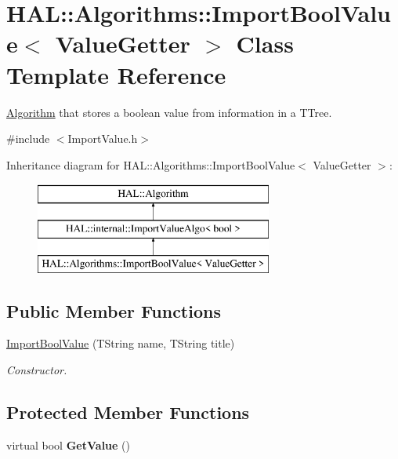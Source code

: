\hypertarget{class_h_a_l_1_1_algorithms_1_1_import_bool_value}{\section{H\+A\+L\+:\+:Algorithms\+:\+:Import\+Bool\+Value$<$ Value\+Getter $>$ Class Template Reference}
\label{class_h_a_l_1_1_algorithms_1_1_import_bool_value}
}


\hyperlink{class_h_a_l_1_1_algorithm}{Algorithm} that stores a boolean value from information in a T\+Tree.  




{\ttfamily \#include $<$Import\+Value.\+h$>$}

Inheritance diagram for H\+A\+L\+:\+:Algorithms\+:\+:Import\+Bool\+Value$<$ Value\+Getter $>$\+:\begin{figure}[H]
\begin{center}
\leavevmode
\includegraphics[height=3.000000cm]{class_h_a_l_1_1_algorithms_1_1_import_bool_value}
\end{center}
\end{figure}
\subsection*{Public Member Functions}
\begin{DoxyCompactItemize}
\item 
\hyperlink{class_h_a_l_1_1_algorithms_1_1_import_bool_value_a06b77726d1cfcd155fb7e28ee304a917}{Import\+Bool\+Value} (T\+String name, T\+String title)
\begin{DoxyCompactList}\small\item\em Constructor. \end{DoxyCompactList}\end{DoxyCompactItemize}
\subsection*{Protected Member Functions}
\begin{DoxyCompactItemize}
\item 
\hypertarget{class_h_a_l_1_1_algorithms_1_1_import_bool_value_a71a3ae1f800a947904fdf0d1c7af4c17}{virtual bool {\bfseries Get\+Value} ()}\label{class_h_a_l_1_1_algorithms_1_1_import_bool_value_a71a3ae1f800a947904fdf0d1c7af4c17}

\end{DoxyCompactItemize}
